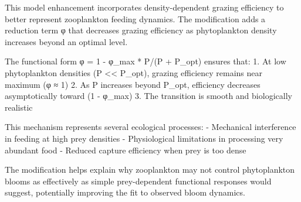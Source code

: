 This model enhancement incorporates density-dependent grazing efficiency to better represent zooplankton feeding dynamics. The modification adds a reduction term φ that decreases grazing efficiency as phytoplankton density increases beyond an optimal level.

The functional form φ = 1 - φ_max * P/(P + P_opt) ensures that:
1. At low phytoplankton densities (P << P_opt), grazing efficiency remains near maximum (φ ≈ 1)
2. As P increases beyond P_opt, efficiency decreases asymptotically toward (1 - φ_max)
3. The transition is smooth and biologically realistic

This mechanism represents several ecological processes:
- Mechanical interference in feeding at high prey densities
- Physiological limitations in processing very abundant food
- Reduced capture efficiency when prey is too dense

The modification helps explain why zooplankton may not control phytoplankton blooms as effectively as simple prey-dependent functional responses would suggest, potentially improving the fit to observed bloom dynamics.

